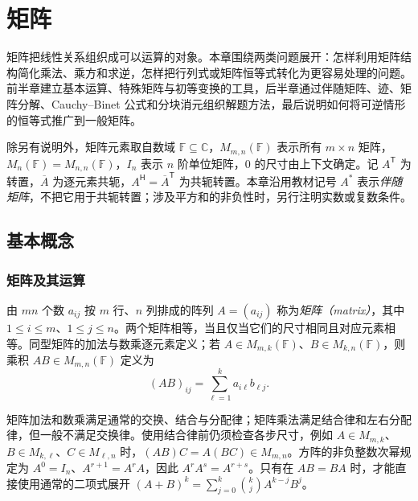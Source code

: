 \setcounter{chapter}{1} %
\chapter{矩阵}
\label{chap:matrices}

矩阵把线性关系组织成可以运算的对象。本章围绕两类问题展开：怎样利用矩阵结构简化乘法、乘方和求逆，怎样把行列式或矩阵恒等式转化为更容易处理的问题。前半章建立基本运算、特殊矩阵与初等变换的工具，后半章通过伴随矩阵、迹、矩阵分解、Cauchy--Binet 公式和分块消元组织解题方法，最后说明如何将可逆情形的恒等式推广到一般矩阵。

除另有说明外，矩阵元素取自数域 $\mathbb F\subseteq\mathbb C$，$M_{m,n}(\mathbb F)$ 表示所有 $m\times n$ 矩阵，$M_n(\mathbb F)=M_{n,n}(\mathbb F)$，$I_n$ 表示 $n$ 阶单位矩阵，$0$ 的尺寸由上下文确定。记 $A^{\mathsf T}$ 为转置，$\overline A$ 为逐元素共轭，$A^{\mathsf H}=\overline A^{\mathsf T}$ 为共轭转置。本章沿用教材记号 $A^*$ 表示\emph{伴随矩阵}，不把它用于共轭转置；涉及平方和的非负性时，另行注明实数或复数条件。

\section{基本概念}
\label{sec:matrix-basic}

\subsection{矩阵及其运算}

\begin{definition}
\label{def:matrix-operations}
由 $mn$ 个数 $a_{ij}$ 按 $m$ 行、$n$ 列排成的阵列 $A=(a_{ij})$ 称为\emph{矩阵（matrix）}，其中 $1\le i\le m$、$1\le j\le n$。两个矩阵相等，当且仅当它们的尺寸相同且对应元素相等。同型矩阵的加法与数乘逐元素定义；若 $A\in M_{m,k}(\mathbb F)$、$B\in M_{k,n}(\mathbb F)$，则乘积 $AB\in M_{m,n}(\mathbb F)$ 定义为
\begin{equation}
 (AB)_{ij}=\sum_{\ell=1}^{k}a_{i\ell}b_{\ell j}.
 \label{eq:matrix-product-entry}
\end{equation}
\end{definition}

矩阵加法和数乘满足通常的交换、结合与分配律；矩阵乘法满足结合律和左右分配律，但一般不满足交换律。使用结合律前仍须检查各步尺寸，例如 $A\in M_{m,k}$、$B\in M_{k,\ell}$、$C\in M_{\ell,n}$ 时，$(AB)C=A(BC)\in M_{m,n}$。方阵的非负整数次幂规定为 $A^0=I_n$、$A^{r+1}=A^rA$，因此 $A^rA^s=A^{r+s}$。只有在 $AB=BA$ 时，才能直接使用通常的二项式展开 $(A+B)^k=\sum_{j=0}^k\binom{k}{j}A^{k-j}B^j$。

